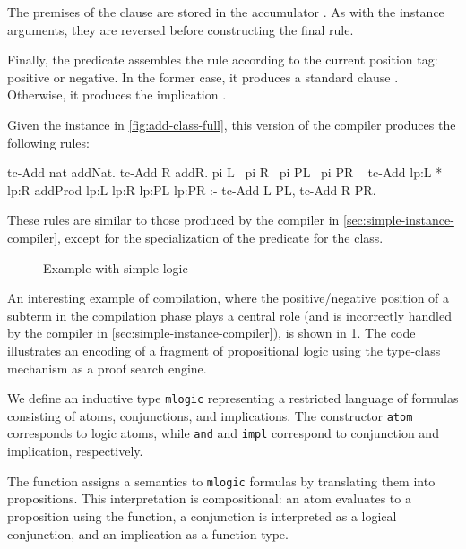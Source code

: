 The premises of the clause are stored in the accumulator . As with the
instance arguments, they are reversed before constructing the final rule.

Finally, the predicate  assembles the rule according to the
current position tag: positive or negative. In the former
case, it produces a standard clause
. Otherwise, it produces the implication %
.

Given the instance in \cref{fig:add-class-full}, this version of the
compiler produces the following rules:

\begin{elpicode}
  tc-Add {{nat}} {{addNat}}.
  tc-Add {{R}} {{addR}}.
  pi L \ pi R \ pi PL \ pi PR \ %
    tc-Add {{lp:L * lp:R}} {{addProd lp:L lp:R lp:PL lp:PR}} :-
      tc-Add L PL, tc-Add R PR.
\end{elpicode}

\noindent
These rules are similar to those produced by the compiler in
\cref{sec:simple-instance-compiler}, except for the specialization of the
predicate  for the  class.

\begin{figure}
  
  \caption{Example with simple logic}
  \label{fig:h-clause}
\end{figure}

An interesting example of compilation, where the positive/negative
position of a subterm in the compilation phase plays a
central role (and is incorrectly handled by the compiler in
\cref{sec:simple-instance-compiler}), is shown in
\cref{fig:h-clause}. The code illustrates an encoding of a fragment of
propositional logic using the \rocq{} type-class mechanism as a proof
search engine.

We define an inductive type \texttt{mlogic} representing a restricted
language of formulas consisting of atoms, conjunctions, and
implications. The constructor \texttt{atom} corresponds to logic atoms, 
while \texttt{and} and
\texttt{impl} correspond to conjunction and implication,
respectively.

The function  assigns a semantics to \texttt{mlogic}
formulas by translating them into \rocq{} propositions. This
interpretation is compositional: an atom evaluates to a proposition using
the  function, a conjunction is interpreted as a logical conjunction,
and an implication as a function type.

